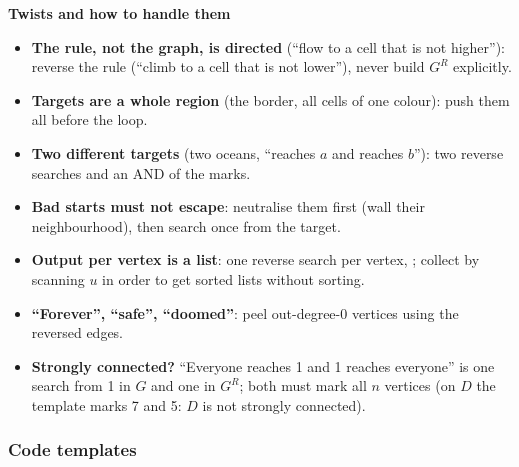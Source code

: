 \textbf{Twists and how to handle them}
\begin{itemize}[leftmargin=*]
    \item \textbf{The rule, not the graph, is directed} (``flow to a cell that is not higher''): reverse the rule (``climb to a cell that is not lower''), never build $G^R$ explicitly.
    \item \textbf{Targets are a whole region} (the border, all cells of one colour): push them all before the loop.
    \item \textbf{Two different targets} (two oceans, ``reaches $a$ and reaches $b$''): two reverse searches and an AND of the marks.
    \item \textbf{Bad starts must not escape}: neutralise them first (wall their neighbourhood), then search once from the target.
    \item \textbf{Output per vertex is a list}: one reverse search per vertex, ; collect by scanning $u$ in order to get sorted lists without sorting.
    \item \textbf{``Forever'', ``safe'', ``doomed''}: peel out-degree-0 vertices using the reversed edges.
    \item \textbf{Strongly connected?} ``Everyone reaches 1 and 1 reaches everyone'' is one search from 1 in $G$ and one in $G^R$; both must mark all $n$ vertices (on $D$ the template marks 7 and 5: $D$ is not strongly connected).
\end{itemize}

\subsubsection*{Code templates}

